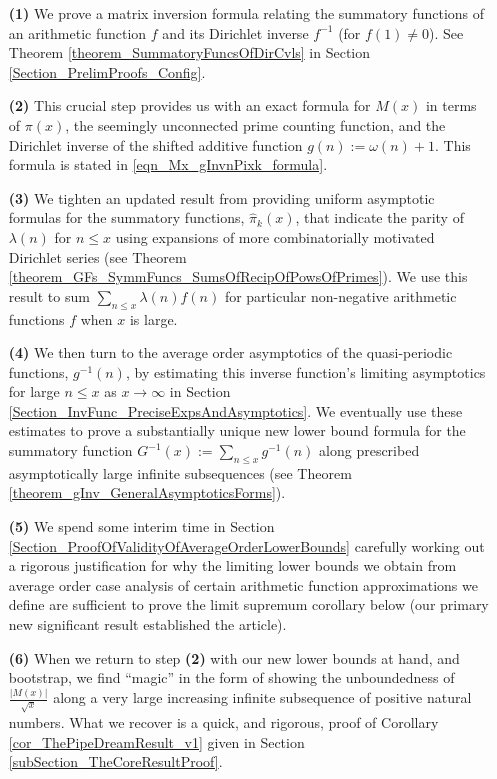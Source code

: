 \documentclass[11pt,reqno,a4letter]{article}
\numberwithin{figure}{section}
\numberwithin{table}{section}
\theoremstyle{plain}
\numberwithin{theorem}{section}
\theoremstyle{definition}
\begin{document}
\begin{itemize} 

\item[\textbf{(1)}] We prove a matrix inversion formula relating the summatory 
           functions of an arithmetic function $f$ and its Dirichlet inverse $f^{-1}$ (for $f(1) \neq 0$). 
           See 
           Theorem \ref{theorem_SummatoryFuncsOfDirCvls} in 
           Section \ref{Section_PrelimProofs_Config}.  
\item[\textbf{(2)}] This crucial step provides us with an exact formula for $M(x)$ in terms of $\pi(x)$, the seemingly 
           unconnected prime counting function, and the 
           Dirichlet inverse of the shifted additive function $g(n) := \omega(n)+1$. This 
           formula is stated in \eqref{eqn_Mx_gInvnPixk_formula}.  
\item[\textbf{(3)}] We tighten an updated result from \cite[\S 7]{MV} providing uniform asymptotic formulas for the  
           summatory functions, $\widehat{\pi}_k(x)$, that indicate the parity of 
           $\lambda(n)$ for $n \leq x$ using expansions of more combinatorially motivated Dirichlet series 
           (see Theorem \ref{theorem_GFs_SymmFuncs_SumsOfRecipOfPowsOfPrimes}). 
           We use this result to sum $\sum_{n \leq x} \lambda(n) f(n)$ for particular non-negative arithmetic 
           functions $f$ when $x$ is large. 
\item[\textbf{(4)}] We then turn to the average order 
           asymptotics of the quasi-periodic functions, $g^{-1}(n)$, by estimating this inverse function's 
           limiting asymptotics for large $n \leq x$ as $x \rightarrow \infty$ in 
           Section \ref{Section_InvFunc_PreciseExpsAndAsymptotics}. 
           We eventually use these estimates to prove a substantially unique new lower bound formula 
           for the summatory function $G^{-1}(x) := \sum_{n \leq x} g^{-1}(n)$ along prescribed asymptotically large 
           infinite subsequences (see Theorem \ref{theorem_gInv_GeneralAsymptoticsForms}). 
\item[\textbf{(5)}] We spend some interim time in Section \ref{Section_ProofOfValidityOfAverageOrderLowerBounds} 
           carefully working out a rigorous justification for why the limiting lower bounds we obtain from average 
           order case analysis of certain arithmetic function approximations 
           we define are sufficient to prove the limit supremum corollary below 
           (our primary new significant result established the article). 
\item[\textbf{(6)}] When we return to step \textbf{(2)} 
           with our new lower bounds at hand, and bootstrap, we find ``magic'' in the form of 
           showing the unboundedness of $\frac{|M(x)|}{\sqrt{x}}$ 
           along a very large increasing infinite subsequence 
           of positive natural numbers. What we recover is a quick, and rigorous, proof of 
           Corollary \ref{cor_ThePipeDreamResult_v1} given in 
           Section \ref{subSection_TheCoreResultProof}. 
           
\end{itemize} 
\end{document}
